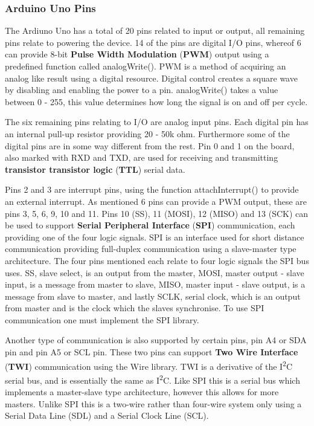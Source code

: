 \subsubsection{Arduino Uno Pins}\label{subsubsec:arduino-uno-pins}
The Ardiuno Uno has a total of 20 pins related to input or output, all remaining pins relate to powering the device.
14 of the pins are digital I/O pins, whereof 6 can provide 8-bit \textbf{Pulse Width Modulation} (\textbf{PWM}) output using a predefined function called analogWrite(). %
PWM is a method of acquiring an analog like result using a digital resource.
Digital control creates a square wave by disabling and enabling the power to a pin.
analogWrite() takes a value between 0 - 255, this value determines how long the signal is on and off per cycle.

The six remaining pins relating to I/O are analog input pins.
Each digital pin has an internal pull-up resistor providing 20 - 50k ohm.
Furthermore some of the digital pins are in some way different from the rest.
Pin 0 and 1 on the board, also marked with RXD and TXD, are used for receiving and transmitting \textbf{transistor transistor logic} (\textbf{TTL}) serial data. %


Pins 2 and 3 are interrupt pins, using the function attachInterrupt() to provide an external interrupt. %
As mentioned 6 pins can provide a PWM output, these are pins 3, 5, 6, 9, 10 and 11.
Pins 10 (SS), 11 (MOSI), 12 (MISO) and 13 (SCK) can be used to support \textbf{Serial Peripheral Interface} (\textbf{SPI}) communication, each providing one of the four logic signals. %
SPI is an interface used for short distance communication providing full-duplex communication using a slave-master type architecture.
The four pins mentioned each relate to four logic signals the SPI bus uses.
SS, slave select, is an output from the master, MOSI, master output - slave input, is a message from master to slave, MISO, master input - slave output, is a message from slave to master, and lastly SCLK, serial clock, which is an output from master and is the clock which the slaves synchronise.
To use SPI communication one must implement the SPI library.

Another type of communication is also supported by certain pins, pin A4 or SDA pin and pin A5 or SCL pin.
These two pins can support \textbf{Two Wire Interface} (\textbf{TWI}) communication using the Wire library. %
TWI is a derivative of the I\textsuperscript{2}C serial bus, and is essentially the same as I\textsuperscript{2}C.
Like SPI this is a serial bus which implements a master-slave type architecture, however this allows for more masters.
Unlike SPI this is a two-wire rather than four-wire system only using a Serial Data Line (SDL) and a Serial Clock Line (SCL).
